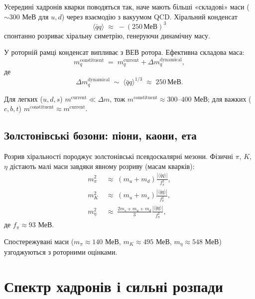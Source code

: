 \documentclass[11pt,a4paper]{article}
\theoremstyle{definition}
\theoremstyle{plain}
\theoremstyle{remark}
\begin{document}
Усередині хадронів кварки поводяться так, наче мають більші «складові» маси ($\sim 300$ МеВ для $u,d$) через взаємодію з вакуумом QCD. Хіральний конденсат
\begin{equation}
\langle \bar{q}q \rangle \;\approx\; -(250\,\text{МеВ})^3
\end{equation}
спонтанно розриває хіральну симетрію, генеруючи динамічну масу.

У роторній рамці конденсат випливає з ВЕВ ротора. Ефективна складова маса:
\begin{equation}
m_q^{\mathrm{constituent}} \;=\; m_q^{\mathrm{current}} + \Delta m_q^{\mathrm{dynamical}},
\end{equation}
де
\begin{equation}
\Delta m_q^{\mathrm{dynamical}} \;\sim\; \langle \bar{q}q \rangle^{1/3} \;\approx\; 250\,\text{МеВ}.
\end{equation}

Для легких ($u,d,s$) $m^{\mathrm{current}}\ll \Delta m$, тож $m^{\mathrm{constituent}}\approx 300$–$400$ МеВ; для важких ($c,b,t$) $m^{\mathrm{constituent}}\approx m^{\mathrm{current}}$.

\subsection{Золстонівські бозони: піони, каони, ета}

Розрив хіральності породжує золстонівські псевдоскалярні мезони. Фізичні $\pi$, $K$, $\eta$ дістають малі маси завдяки явному розриву (масам кварків):
\begin{align}
m_\pi^2 &\;\approx\; (m_u + m_d)\frac{|\langle\bar{q}q\rangle|}{f_\pi^2}, \\
m_K^2 &\;\approx\; (m_u + m_s)\frac{|\langle\bar{q}q\rangle|}{f_\pi^2}, \\
m_\eta^2 &\;\approx\; \frac{2m_s + m_u + m_d}{3}\frac{|\langle\bar{q}q\rangle|}{f_\pi^2},
\end{align}
де $f_\pi\approx 93$ МеВ.

Спостережувані маси ($m_\pi\approx 140$ МеВ, $m_K\approx 495$ МеВ, $m_\eta\approx 548$ МеВ) узгоджуються з роторними оцінками.

\vspace{1em}

\section{Спектр хадронів і сильні розпади}
\label{sec:hadron-spectrum}
\end{document}

